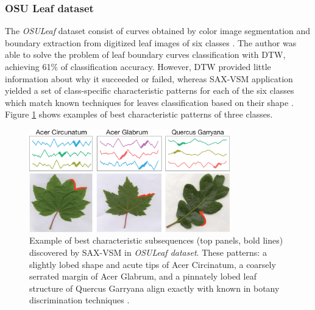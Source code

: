 \documentclass[conference]{IEEEtran}
\begin{document}
\subsubsection{OSU Leaf dataset}
The \textit{OSULeaf} dataset consist of curves obtained by color image segmentation 
and boundary extraction from digitized leaf images of six classes \cite{osuleaf}.
The author was able to solve the problem of leaf boundary curves classification 
with DTW, achieving 61\% of classification accuracy. 
However, DTW provided little information about why it succeeded or failed,
whereas SAX-VSM application yielded a set of class-specific characteristic 
patterns for each of the six classes which match known techniques for leaves 
classification based on their shape \cite{dirr}. Figure \ref{fig:shapelet-acer-patterns}
shows examples of best characteristic patterns of three classes.

\begin{figure}[t]
   \centering
   \vspace{-0.2cm}
   \includegraphics[width=87mm]{figures/AcerCircunatum-short.eps}
  \caption{Example of best characteristic subsequences (top panels, bold lines) discovered 
   by SAX-VSM in \textit{OSULeaf dataset}.
   These patterns: a slightly lobed shape and acute tips of Acer Circinatum, 
   a coarsely serrated margin of Acer Glabrum, 
   and a pinnately lobed leaf structure of Quercus Garryana
   align exactly with known in botany discrimination techniques \cite{dirr}.}
   \label{fig:shapelet-acer-patterns}
   \vspace{-0.2cm}
\end{figure}
\end{document}
